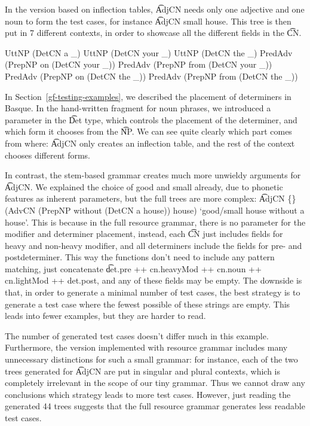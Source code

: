 In the version based on inflection tables, \t{AdjCN} needs only one
adjective and one noun to form the test cases, for instance \t{AdjCN
  small house}.
This tree is then put in 7 different contexts, in order to showcase
all the different fields in the \t{CN}.

\begin{EmptyItem}
\begin{Highlighting}[]
UttNP (DetCN a _)
UttNP (DetCN your _)
UttNP (DetCN the _)
PredAdv  (PrepNP on (DetCN your _))
PredAdv  (PrepNP from (DetCN your _))
PredAdv  (PrepNP on (DetCN the _))
PredAdv  (PrepNP from (DetCN the _))
\end{Highlighting}
\end{EmptyItem}

\noindent In Section~\ref{gf-testing-examples}, we described the
placement of determiners in Basque. In the hand-written fragment for
noun phrases, we introduced a parameter in the \t{Det} type, which
controls the placement of the determiner, and which form it chooses
from the \t{NP}. We can see quite clearly which part comes from where:
\t{AdjCN} only creates an inflection table, and the rest of the
context chooses different forms.


In contrast, the stem-based grammar creates much more unwieldy
arguments for \t{AdjCN}. We explained the choice of good and small
already, due to phonetic features as inherent parameters, but the full
trees are more complex: \t{AdjCN \{\} (AdvCN (PrepNP without (DetCN a house))
  house)} `good/small house without a house'.  This is because in the full
resource grammar, there is no parameter for the modifier and
determiner placement, instead, each \t{CN} just includes fields for
heavy and non-heavy modifier, and all determiners include the fields
for pre- and postdeterminer. This way the functions don't need to
include any pattern matching, just concatenate \t{det.pre ++
  cn.heavyMod ++ cn.noun ++ cn.lightMod ++ det.post}, and any of these
fields may be empty. The downside is that, in order to generate a
minimal number of test cases, the best strategy is to generate a test
case where the fewest possible of these strings are empty. This leads
into fewer examples, but they are harder to read.

The number of generated test cases doesn't differ much in this
example. Furthermore, the version implemented with resource grammar
includes many unnecessary distinctions for such a small grammar: for
instance, each of the two trees generated for \t{AdjCN} are put in
singular and plural contexts, which is completely irrelevant in the
scope of our tiny grammar.  Thus we cannot draw any conclusions which
strategy leads to more test cases. However, just reading the generated
44 trees suggests that the full resource grammar generates less
readable test cases.

